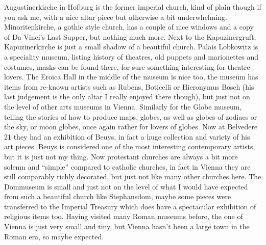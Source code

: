 Augustinerkirche in Hofburg is the former imperial church, kind of plain though if you ask me, with a nice altar piece but otherwise a bit underwhelming. Minoritenkirche, a gothic style church, has a couple of nice windows and a copy of Da Vinci's Last Supper, but nothing much more. Next to the Kapuzinergruft, Kapuzinerkirche is just a small shadow of a beautiful church. Palais Lobkowitz is a speciality museum, listing history of theatres, old puppets and marionettes and costumes, masks can be found there, for sure something interesting for theatre lovers. The Eroica Hall in the middle of the museum is nice too, the museum has items from re-known artists such as Rubens, Boticelli or Hieronymus Bosch (his last judgement is the only altar I really enjoyed there though), but just not on the level of other arts museums in Vienna. Similarly for the Globe museum, telling the stories of how to produce maps, globes, as well as globes of zodiacs or the sky, or moon globes, once again rather for lovers of globes. Now at Belvedere 21 they had an exhibition of Beuys, in fact a huge collection and variety of his art pieces. Beuys is considered one of the most interesting contemporary artists, but it is just not my thing. Now protestant churches are always a bit more solemn and ``simple'' compared to catholic churches, in fact in Vienna they are still comparably richly decorated, but just not like many other churches here. The Dommuseum is small and just not on the level of what I would have expected from such a beautiful church like Stephansdom, maybe some pieces were transferred to the Imperial Treasury which does have a spectacular exhibition of religious items too. Having visited many Roman museums before, the one of Vienna is just very small and tiny, but Vienna hasn't been a large town in the Roman era, so maybe expected.\\
